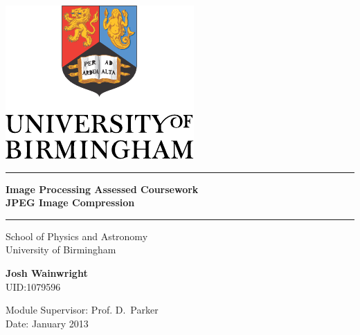 \begin{titlepage}
  \begin{center}
    \vspace*{\fill}

    \centering
    \includegraphics[scale=1.0]{Logo.pdf}
    \vfill

    \hrule
    {\LARGE\bf Image Processing Assessed Coursework\\JPEG Image Compression \\[0.4cm]}
    \hrule

    \vfill
    \large
    School of Physics and Astronomy\\
    University of Birmingham

    \vfill
    {\bf Josh Wainwright\\}
    UID:1079596
    \vfill

    \vfill
    Module Supervisor: Prof. D.\ Parker\\
    Date: January 2013
    \vfill
    
    \vfill

  \end{center}
\end{titlepage}


